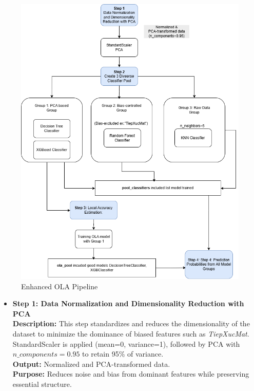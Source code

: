 \documentclass[conference]{IEEEtran}
\begin{document}
\begin{enumerate}
\begin{figure}[H]
    \centering
    \includegraphics[width=0.95\linewidth]{images/structure_imp_ola.png} 
    \caption{Enhanced OLA Pipeline}
    \label{fig:ola_pipeline}
\end{figure}
\begin{itemize}
\item \textbf{Step 1: Data Normalization and Dimensionality Reduction with PCA}~\\
\textbf{Description:} This step standardizes and reduces the dimensionality of the dataset to minimize the dominance of biased features such as \textit{TiepXucMat}. StandardScaler is applied (mean=0, variance=1), followed by PCA with $n\_components=0.95$ to retain 95\% of variance.\\
\textbf{Output:} Normalized and PCA-transformed data.\\
\textbf{Purpose:} Reduces noise and bias from dominant features while preserving essential structure.


\end{itemize}
\end{enumerate}
\end{document}
